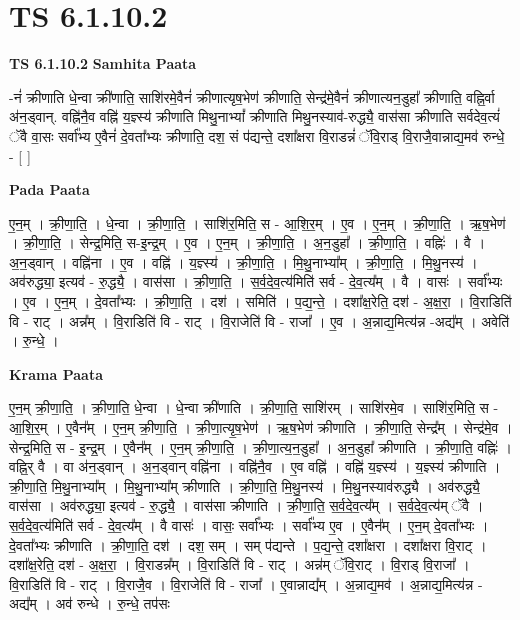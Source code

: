 \documentclass[17pt]{extarticle}
\begin{document}
\section{ TS 6.1.10.2 }

\textbf{TS 6.1.10.2 } \newline
\textbf{Samhita Paata} \newline

-नं॑ क्रीणाति धे॒न्वा क्री॑णाति॒ साशि॑रमे॒वैनं॑ क्रीणात्यृष॒भेण॑ क्रीणाति॒ सेन्द्र॑मे॒वैनं॑ क्रीणात्यन॒डुहा᳚ क्रीणाति॒ वह्नि॒र्वा अ॑न॒ड्वान्. वह्नि॑नै॒व वह्नि॑ य॒ज्ञ्स्य॑ क्रीणाति मिथु॒नाभ्यां᳚ क्रीणाति मिथु॒नस्याव॑-रुद्ध्यै॒ वास॑सा क्रीणाति सर्वदेव॒त्यं॑ ॅवै वा॒सः सर्वा᳚भ्य ए॒वैनं॑ दे॒वता᳚भ्यः क्रीणाति॒ दश॒ सं प॑द्यन्ते॒ दशा᳚क्षरा वि॒राडन्नं॑ ॅवि॒राड् वि॒राजै॒वान्नाद्य॒मव॑ रुन्धे॒ - [  ] \newline

\textbf{Pada Paata} \newline

ए॒न॒म् । क्री॒णा॒ति॒ । धे॒न्वा । क्री॒णा॒ति॒ । साशि॑र॒मिति॒ स - आ॒शि॒र॒म् । ए॒व । ए॒न॒म् । क्री॒णा॒ति॒ । ऋ॒ष॒भेण॑ । क्री॒णा॒ति॒ । सेन्द्र॒मिति॒ स-इ॒न्द्र॒म् । ए॒व । ए॒न॒म् । क्री॒णा॒ति॒ । अ॒न॒डुहा᳚ । क्री॒णा॒ति॒ । वह्निः॑ । वै । अ॒न॒ड्वान् । वह्नि॑ना । ए॒व । वह्नि॑ । य॒ज्ञ्स्य॑ । क्री॒णा॒ति॒ । मि॒थु॒नाभ्या᳚म् । क्री॒णा॒ति॒ । मि॒थु॒नस्य॑ । अव॑रुद्ध्या॒ इत्यव॑ - रु॒द्ध्यै॒ । वास॑सा । क्री॒णा॒ति॒ । स॒र्व॒दे॒व॒त्य॑मिति॑ सर्व - दे॒व॒त्य᳚म् । वै । वासः॑ । सर्वा᳚भ्यः । ए॒व । ए॒न॒म् । दे॒वता᳚भ्यः । क्री॒णा॒ति॒ । दश॑ । समिति॑ । प॒द्य॒न्ते॒ । दशा᳚क्ष॒रेति॒ दश॑ - अ॒क्ष॒रा॒ । वि॒राडिति॑ वि - राट् । अन्न᳚म् । वि॒राडिति॑ वि - राट् । वि॒राजेति॑ वि - राजा᳚ । ए॒व । अ॒न्नाद्य॒मित्य॑न्न -अद्य᳚म् । अवेति॑ । रु॒न्धे॒ ।  \newline


\textbf{Krama Paata} \newline

ए॒न॒म् क्री॒णा॒ति॒ । क्री॒णा॒ति॒ धे॒न्वा । धे॒न्वा क्री॑णाति । क्री॒णा॒ति॒ साशि॑रम् । साशि॑रमे॒व । साशि॑र॒मिति॒ स - आ॒शि॒र॒म् । ए॒वैन᳚म् । ए॒न॒म् क्री॒णा॒ति॒ । क्री॒णा॒त्यृ॒ष॒भेण॑ । ऋ॒ष॒भेण॑ क्रीणाति । क्री॒णा॒ति॒ सेन्द्र᳚म् । सेन्द्र॑मे॒व । सेन्द्र॒मिति॒ स - इ॒न्द्र॒म् । ए॒वैन᳚म् । ए॒न॒म् क्री॒णा॒ति॒ । क्री॒णा॒त्य॒न॒डुहा᳚ । अ॒न॒डुहा᳚ क्रीणाति । क्री॒णा॒ति॒ वह्निः॑ । वह्नि॒र् वै । वा अ॑न॒ड्वान् । अ॒न॒ड्वान् वह्नि॑ना । वह्नि॑नै॒व । ए॒व वह्नि॑ । वह्नि॑ य॒ज्ञ्स्य॑ । य॒ज्ञ्स्य॑ क्रीणाति । क्री॒णा॒ति॒ मि॒थु॒नाभ्या᳚म् । मि॒थु॒नाभ्या᳚म् क्रीणाति । क्री॒णा॒ति॒ मि॒थु॒नस्य॑ । मि॒थु॒नस्याव॑रुद्ध्यै । अव॑रुद्ध्यै॒ वास॑सा । अव॑रुद्ध्या॒ इत्यव॑ - रु॒द्ध्यै॒ । वास॑सा क्रीणाति । क्री॒णा॒ति॒ स॒र्व॒दे॒व॒त्य᳚म् । स॒र्व॒दे॒व॒त्य॑म् ॅवै । स॒र्व॒दे॒व॒त्य॑मिति॑ सर्व - दे॒व॒त्य᳚म् । वै वासः॑ । वासः॒ सर्वा᳚भ्यः । सर्वा᳚भ्य ए॒व । ए॒वैन᳚म् । ए॒न॒म् दे॒वता᳚भ्यः । दे॒वता᳚भ्यः क्रीणाति । क्री॒णा॒ति॒ दश॑ । दश॒ सम् । सम् प॑द्यन्ते । प॒द्य॒न्ते॒ दशा᳚क्षरा । दशा᳚क्षरा वि॒राट् । दशा᳚क्ष॒रेति॒ दश॑ - अ॒क्ष॒रा॒ । वि॒राडन्न᳚म् । वि॒राडिति॑ वि - राट् । अन्न॑म् ॅवि॒राट् । वि॒राड् वि॒राजा᳚ । वि॒राडिति॑ वि - राट् । वि॒राजै॒व । वि॒राजेति॑ वि - राजा᳚ । ए॒वान्नाद्य᳚म् । अ॒न्नाद्य॒मव॑ । अ॒न्नाद्य॒मित्य॑न्न - अद्य᳚म् । अव॑ रुन्धे । रु॒न्धे॒ तप॑सः \newline
\end{document}
